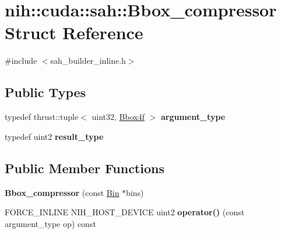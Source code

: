 \hypertarget{structnih_1_1cuda_1_1sah_1_1_bbox__compressor}{
\section{nih\-:\-:cuda\-:\-:sah\-:\-:\-Bbox\-\_\-compressor \-Struct \-Reference}
\label{structnih_1_1cuda_1_1sah_1_1_bbox__compressor}
}


{\ttfamily \#include $<$sah\-\_\-builder\-\_\-inline.\-h$>$}

\subsection*{\-Public \-Types}
\begin{DoxyCompactItemize}
\item 
\hypertarget{structnih_1_1cuda_1_1sah_1_1_bbox__compressor_a36e40d25f42ea989cd0fa4d2d3c1e13a}{
typedef thrust\-::tuple$<$ uint32, \*
\hyperlink{structnih_1_1_bbox}{\-Bbox4f} $>$ {\bfseries argument\-\_\-type}}
\label{structnih_1_1cuda_1_1sah_1_1_bbox__compressor_a36e40d25f42ea989cd0fa4d2d3c1e13a}

\item 
\hypertarget{structnih_1_1cuda_1_1sah_1_1_bbox__compressor_a91750af2676bbb287f94a0d8c66ba078}{
typedef uint2 {\bfseries result\-\_\-type}}
\label{structnih_1_1cuda_1_1sah_1_1_bbox__compressor_a91750af2676bbb287f94a0d8c66ba078}

\end{DoxyCompactItemize}
\subsection*{\-Public \-Member \-Functions}
\begin{DoxyCompactItemize}
\item 
\hypertarget{structnih_1_1cuda_1_1sah_1_1_bbox__compressor_a0c9a2ee1d40af70f6aef9ee5475f7a90}{
{\bfseries \-Bbox\-\_\-compressor} (const \hyperlink{structnih_1_1cuda_1_1sah_1_1_bin}{\-Bin} $\ast$bins)}
\label{structnih_1_1cuda_1_1sah_1_1_bbox__compressor_a0c9a2ee1d40af70f6aef9ee5475f7a90}

\item 
\hypertarget{structnih_1_1cuda_1_1sah_1_1_bbox__compressor_af0caef27174593c0da4e5440a4f3359c}{
\-F\-O\-R\-C\-E\-\_\-\-I\-N\-L\-I\-N\-E \-N\-I\-H\-\_\-\-H\-O\-S\-T\-\_\-\-D\-E\-V\-I\-C\-E uint2 {\bfseries operator()} (const argument\-\_\-type op) const }
\label{structnih_1_1cuda_1_1sah_1_1_bbox__compressor_af0caef27174593c0da4e5440a4f3359c}

\end{DoxyCompactItemize}
